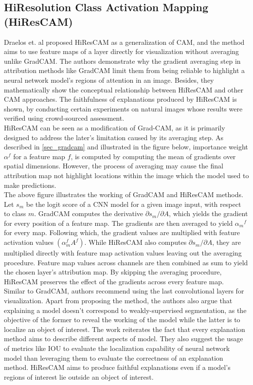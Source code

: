 \documentclass[../report.tex]{subfiles}
\begin{document}
\subsection{HiResolution Class Activation Mapping (HiResCAM)}
	Draelos et. al proposed HiResCAM \cite{draelos2020hirescam} as a generalization of CAM, and the method aims to use feature maps of a layer directly for visualization without averaging unlike GradCAM. The authors demonstrate why the gradient averaging step in attribution methods like GradCAM limit them from being reliable to highlight a neural network model’s regions of attention in an image. Besides, they mathematically show the conceptual relationship between HiResCAM and other CAM approaches. The faithfulness of explanations produced by HiResCAM is shown, by conducting certain experiments on natural images whose results were verified using crowd-sourced assessment.\\
	HiResCAM can be seen as a modification of Grad-CAM, as it is primarily designed to address the later’s limitation caused by its averaging step. As described in \ref{sec_gradcam} and illustrated in the figure below, importance weight $\alpha^f$ for a feature map $f$, is computed by computing the mean of gradients over spatial dimensions. However, the process of averaging may cause the final attribution map not highlight locations within the image which the model used to make predictions.\\
	The above figure illustrates the working of GradCAM and HiResCAM methods. Let $s_m$ be the logit score of a CNN model for a given image input, with respect to class $m$. GradCAM computes the derivative $\partial s_m / \partial A$, which yields the gradient for every position of a feature map. The gradients are then averaged to yield ${\alpha_m}^f$ for every map. Following which, the gradient values are multiplied with feature activation values $(\alpha_m^f A^f)$. While HiResCAM also computes  $\partial s_m / \partial A$, they are multiplied directly with feature map activation values leaving out the averaging procedure. Feature map values across channels are then combined as sum to yield the chosen layer’s attribution map. By skipping the averaging procedure, HiResCAM preserves the effect of the gradients across every feature map.\\
	Similar to GradCAM, authors recommend using the last convolutional layers for visualization. Apart from proposing the method, the authors also argue that explaining a model doesn’t correspond to weakly-supervised segmentation, as the objective of the former to reveal the working of the model while the latter is to localize an object of interest. The work reiterates the fact that every explanation method aims to describe different aspects of model. They also suggest the usage of metrics like IOU to evaluate the localization capability of neural network model than leveraging them to evaluate the correctness of an explanation method. HiResCAM aims to produce faithful explanations even if a model’s regions of interest lie outside an object of interest.\\
\end{document}

